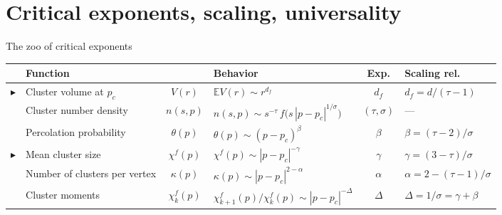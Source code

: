 \documentclass[10pt, aspectratio=169, xcolor={table}]{beamer}
\newcommand{\E}{\mathbb{E}}
\newcommand{\TODO}[1]{{\color{red}\textbf{[TODO]} #1}}
\renewcommand{\TODO}[1]{}
\begin{document}
\section{Critical exponents, scaling, universality}

\begin{frame}{The zoo of critical exponents}
  \footnotesize
  \begin{center}
  \setlength{\tabcolsep}{4pt}
  \renewcommand{\arraystretch}{1.35}
  \begin{tabular}{c l c l c l}
    \toprule
    & \textbf{Function} & & \textbf{Behavior} & \textbf{Exp.} &
      \textbf{Scaling rel.} \\
    \midrule
    \rowcolor{InvisibleBlue}
    $\blacktriangleright$ & Cluster volume at $p_c$           & $V(r)$        & $\E V(r) \sim r^{d_f}$                                                  & $d_f$            & $d_f = d/(\tau - 1)$ \\
    & Cluster number density           & $n(s,p)$      & $n(s,p) \sim s^{-\tau}\, f\!\big(s\,|p-p_c|^{1/\sigma}\big)$             & $(\tau, \sigma)$ & --- \\
    & Percolation probability          & $\theta(p)$   & $\theta(p) \sim (p-p_c)^{\beta}$                                         & $\beta$          & $\beta = (\tau - 2)/\sigma$ \\
    \rowcolor{InvisibleBlue}
    $\blacktriangleright$ & Mean cluster size                & $\chi^f(p)$   & $\chi^f(p) \sim |p-p_c|^{-\gamma}$                                       & $\gamma$         & $\gamma = (3 - \tau)/\sigma$ \\
    & Number of clusters per vertex    & $\kappa(p)$   & $\kappa(p) \sim |p-p_c|^{2-\alpha}$                                      & $\alpha$         & $\alpha = 2 - (\tau-1)/\sigma$ \\
    & Cluster moments                  & $\chi_k^f(p)$ & $\chi_{k+1}^f(p)/\chi_k^f(p) \sim |p-p_c|^{-\Delta}$                     & $\Delta$         & $\Delta = 1/\sigma = \gamma + \beta$ \\
    \bottomrule
  \end{tabular}
  \end{center}

  \vspace{0.4em}
  \normalsize
  \TODO{Verbal: this is the landscape --- five (six) observables, five
        (six) exponents, all tied by scaling relations. We will work
        on the two highlighted rows: the on-critical cluster volume
        (the running example, exponent $d_f$) and, off-critical, the
        mean cluster size (exponent $\gamma$). They are the easiest
        case: \textbf{positive} exponents of the $r^\beta$ family with
        $\beta > 0$. The same statistical machinery lifts to the rest
        with extra work. Hyperscaling $d_f = d/(\tau-1)$ to be
        verified before the talk. Source: [Stauffer'79].}
\end{frame}
\end{document}
